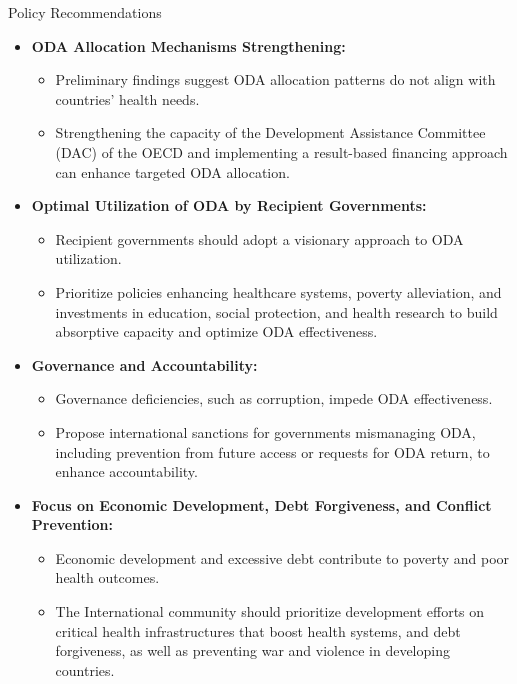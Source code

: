 \documentclass[aspectratio=169,handout, 10pt]{beamer}
\begin{document}
\begin{frame}{Policy Recommendations}
\begin{itemize}
    \item \textbf{ODA Allocation Mechanisms Strengthening:}
        \begin{itemize}
            \item Preliminary findings suggest ODA allocation patterns do not align with countries' health needs.
            \item Strengthening the capacity of the Development Assistance Committee (DAC) of the OECD and implementing a result-based financing approach can enhance targeted ODA allocation.
        \end{itemize}
    
    \item \textbf{Optimal Utilization of ODA by Recipient Governments:}
        \begin{itemize}
            \item Recipient governments should adopt a visionary approach to ODA utilization.
            \item Prioritize policies enhancing healthcare systems, poverty alleviation, and investments in education, social protection, and health research to build absorptive capacity and optimize ODA effectiveness.
        \end{itemize}
    
    \item \textbf{Governance and Accountability:}
        \begin{itemize}
            \item Governance deficiencies, such as corruption, impede ODA effectiveness.
            \item Propose international sanctions for governments mismanaging ODA, including prevention from future access or requests for ODA return, to enhance accountability.
        \end{itemize}
    
    \item \textbf{Focus on Economic Development, Debt Forgiveness, and Conflict Prevention:}
        \begin{itemize}
            \item Economic development and excessive debt contribute to poverty and poor health outcomes.
            \item The International community should prioritize development efforts on critical health infrastructures that boost health systems, and debt forgiveness, as well as preventing war and violence in developing countries.
        \end{itemize}
\end{itemize}
\end{frame}
\end{document}
